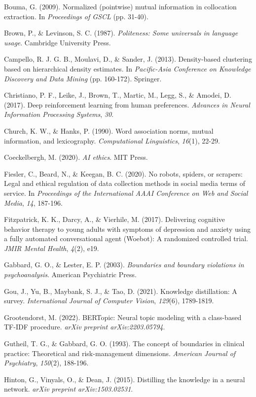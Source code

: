 \documentclass[11pt]{article}
\begin{document}
Bouma, G. (2009). Normalized (pointwise) mutual information in collocation extraction. In \emph{Proceedings of GSCL} (pp. 31-40).

Brown, P., \& Levinson, S. C. (1987). \emph{Politeness: Some universals in language usage}. Cambridge University Press.

Campello, R. J. G. B., Moulavi, D., \& Sander, J. (2013). Density-based clustering based on hierarchical density estimates. In \emph{Pacific-Asia Conference on Knowledge Discovery and Data Mining} (pp. 160-172). Springer.

Christiano, P. F., Leike, J., Brown, T., Martic, M., Legg, S., \& Amodei, D. (2017). Deep reinforcement learning from human preferences. \emph{Advances in Neural Information Processing Systems}, \emph{30}.

Church, K. W., \& Hanks, P. (1990). Word association norms, mutual information, and lexicography. \emph{Computational Linguistics}, \emph{16}(1), 22-29.

Coeckelbergh, M. (2020). \emph{AI ethics}. MIT Press.

Fiesler, C., Beard, N., \& Keegan, B. C. (2020). No robots, spiders, or scrapers: Legal and ethical regulation of data collection methods in social media terms of service. In \emph{Proceedings of the International AAAI Conference on Web and Social Media}, \emph{14}, 187-196.

Fitzpatrick, K. K., Darcy, A., \& Vierhile, M. (2017). Delivering cognitive behavior therapy to young adults with symptoms of depression and anxiety using a fully automated conversational agent (Woebot): A randomized controlled trial. \emph{JMIR Mental Health}, \emph{4}(2), e19.

Gabbard, G. O., \& Lester, E. P. (2003). \emph{Boundaries and boundary violations in psychoanalysis}. American Psychiatric Press.

Gou, J., Yu, B., Maybank, S. J., \& Tao, D. (2021). Knowledge distillation: A survey. \emph{International Journal of Computer Vision}, \emph{129}(6), 1789-1819.

Grootendorst, M. (2022). BERTopic: Neural topic modeling with a class-based TF-IDF procedure. \emph{arXiv preprint arXiv:2203.05794}.

Gutheil, T. G., \& Gabbard, G. O. (1993). The concept of boundaries in clinical practice: Theoretical and risk-management dimensions. \emph{American Journal of Psychiatry}, \emph{150}(2), 188-196.

Hinton, G., Vinyals, O., \& Dean, J. (2015). Distilling the knowledge in a neural network. \emph{arXiv preprint arXiv:1503.02531}.
\end{document}
